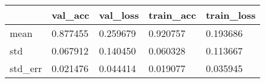 \begin{tabular}{|l|l|l|l|l|}
\toprule \hline
 & val\_acc & val\_loss & train\_acc & train\_loss \\ \hline
\midrule
mean & 0.877455 & 0.259679 & 0.920757 & 0.193686 \\ \hline
std & 0.067912 & 0.140450 & 0.060328 & 0.113667 \\ \hline
std\_err & 0.021476 & 0.044414 & 0.019077 & 0.035945 \\ \hline
\bottomrule
\end{tabular}
